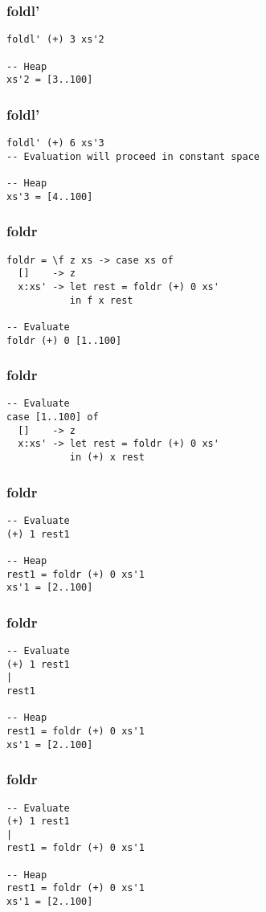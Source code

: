 \documentclass{beamer}
\begin{document}
\begin{frame}[t,fragile]
\frametitle{foldl'}
\begin{verbatim}
foldl' (+) 3 xs'2

-- Heap
xs'2 = [3..100]      
\end{verbatim}
\end{frame}

\begin{frame}[t,fragile]
\frametitle{foldl'}
\begin{verbatim}
foldl' (+) 6 xs'3
-- Evaluation will proceed in constant space

-- Heap
xs'3 = [4..100]      
\end{verbatim}
\end{frame}

\begin{frame}[t,fragile]
\frametitle{foldr}
\begin{verbatim}
foldr = \f z xs -> case xs of
  []    -> z
  x:xs' -> let rest = foldr (+) 0 xs'
           in f x rest

-- Evaluate
foldr (+) 0 [1..100]  
\end{verbatim}
\end{frame}

\begin{frame}[t,fragile]
\frametitle{foldr}
\begin{verbatim}
-- Evaluate
case [1..100] of
  []    -> z
  x:xs' -> let rest = foldr (+) 0 xs'
           in (+) x rest
\end{verbatim}
\end{frame}

\begin{frame}[t,fragile]
\frametitle{foldr}
\begin{verbatim}
-- Evaluate
(+) 1 rest1

-- Heap
rest1 = foldr (+) 0 xs'1
xs'1 = [2..100]
\end{verbatim}
\end{frame}

\begin{frame}[t,fragile]
\frametitle{foldr}
\begin{verbatim}
-- Evaluate
(+) 1 rest1
|
rest1

-- Heap
rest1 = foldr (+) 0 xs'1
xs'1 = [2..100]
\end{verbatim}
\end{frame}

\begin{frame}[t,fragile]
\frametitle{foldr}
\begin{verbatim}
-- Evaluate
(+) 1 rest1
|
rest1 = foldr (+) 0 xs'1

-- Heap
rest1 = foldr (+) 0 xs'1
xs'1 = [2..100]
\end{verbatim}
\end{frame}
\end{document}
